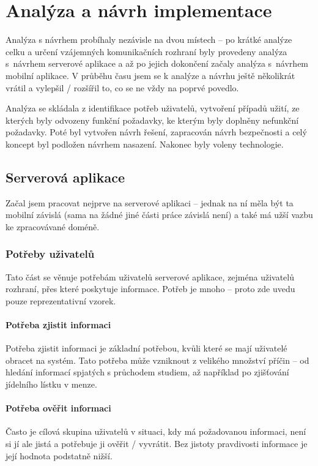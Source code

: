 
\chapter{Analýza a návrh implementace}
Analýza s návrhem probíhaly nezávisle na dvou místech -- po krátké analýze celku a určení vzájemných komunikačních rozhraní byly provedeny analýza s~návrhem serverové aplikace a až po jejich dokončení začaly analýza s~návrhem mobilní aplikace. V průběhu času jsem se k analýze a návrhu ještě několikrát vrátil a vylepšil / rozšířil to, co se ne vždy na poprvé povedlo.

Analýza se skládala z identifikace potřeb uživatelů, vytvoření případů užití, ze kterých byly odvozeny funkční požadavky, ke kterým byly doplněny nefunkční požadavky. Poté byl vytvořen návrh řešení, zapracován návrh bezpečnosti a celý koncept byl podložen návrhem nasazení. Nakonec byly voleny technologie.

\section{Serverová aplikace}
Začal jsem pracovat nejprve na serverové aplikaci -- jednak na ní měla být ta mobilní závislá (sama na žádné jiné části práce závislá není) a také má užší vazbu ke zpracovávané doméně.


\subsection{Potřeby uživatelů}
\label{sec:server:needs}
Tato část se věnuje potřebám uživatelů serverové aplikace, zejména uživatelů rozhraní, přes které poskytuje informace. Potřeb je mnoho -- proto zde uvedu pouze reprezentativní vzorek.

\subsubsection{Potřeba zjistit informaci}
Potřeba zjistit informaci je základní potřebou, kvůli které se mají uživatelé obracet na systém. Tato potřeba může vzniknout z velikého množství příčin -- od hledání informací spjatých s průchodem studiem, až například po zjišťování jídelního lístku v menze. %

\subsubsection{Potřeba ověřit informaci}
Často je cílová skupina uživatelů v situaci, kdy má požadovanou informaci, není si jí ale jistá a potřebuje ji ověřit / vyvrátit. Bez jistoty pravdivosti informace je její hodnota podstatně nižší.

